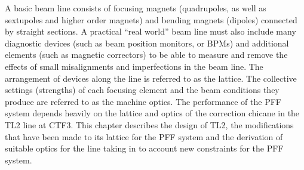 
A basic beam line consists of focusing magnets (quadrupoles, as well as sextupoles and higher order magnets) and bending magnets (dipoles) connected by straight sections. A practical ``real world'' beam line must also include many diagnostic devices (such as beam position monitors, or BPMs) and additional elements (such as magnetic correctors) to be able to measure and remove the effects of small misalignments and imperfections in the beam line. The arrangement of devices along the line is referred to as the lattice. The collective settings (strengths) of each focusing element and the beam conditions they produce are referred to as the machine optics. The performance of the PFF system depends heavily on the lattice and optics of the correction chicane in the TL2 line at CTF3. This chapter describes the design of TL2, the modifications that have been made to its lattice for the PFF system and the derivation of suitable optics for the line taking in to account new constraints for the PFF system.


